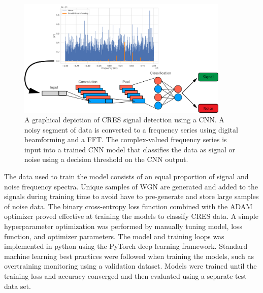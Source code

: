 \begin{figure}[htbp]
    \centering
    \includegraphics*[width=0.9\textwidth]{figs/Chapter-4/230727_deep_filter_process.png}
    \caption{\label{fig:chap4-deepfilter-process} A graphical depiction of CRES signal detection using a CNN. A noisy segment of data is converted to a frequency series using digital beamforming and a FFT. The complex-valued frequency series is input into a trained CNN model that classifies the data as signal or noise using a decision threshold on the CNN output. }
\end{figure}

The data used to train the model consists of an equal proportion of signal and noise frequency spectra. Unique samples of WGN are generated and added to the signals during training time to avoid have to pre-generate and store large samples of noise data. The binary cross-entropy loss function combined with the ADAM optimizer proved effective at training the models to classify CRES data. A simple hyperparameter optimization was performed by manually tuning model, loss function, and optimizer parameters. The model and training loops was implemented in python using the PyTorch deep learning framework. Standard machine learning best practices were followed when training the models, such as overtraining monitoring using a validation dataset. Models were trained until the training loss and accuracy converged and then evaluated using a separate test data set.

